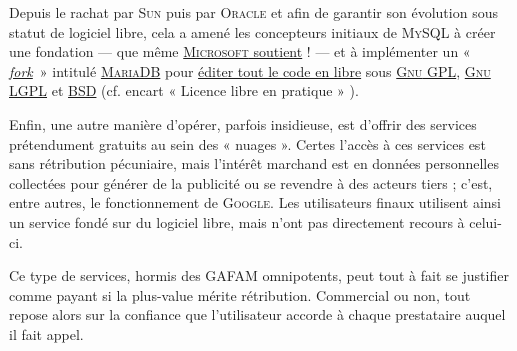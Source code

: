 \begin{enumerate}
Depuis le rachat par \textsc{Sun} puis par \textsc{Oracle} et afin de garantir son évolution sous statut de logiciel libre, cela a amené les concepteurs initiaux de \textsc{MySQL} à créer une fondation --- que même \href{https://mariadb.org/donate/}{\textsc{Microsoft} soutient} ! --- et à implémenter un « \href{https://fr.wikipedia.org/wiki/Fork_(d\%C3\%A9veloppement\_logiciel)}{\textit{fork}}~» intitulé \href{https://mariadb.org/}{\textsc{MariaDB}} pour \href{https://mariadb.com/kb/fr/mariadb-vs-mysql-features/}{éditer tout le code en libre} sous \href{https://www.gnu.org/licenses/gpl-3.0.html}{\textsc{Gnu} GPL}, \href{https://www.gnu.org/licenses/lgpl-3.0.html}{\textsc{Gnu} LGPL} et \href{https://opensource.org/licenses}{BSD} (cf. encart « Licence libre en pratique » ).
\end{enumerate}

Enfin, une autre manière d'opérer, parfois insidieuse, est d'offrir des services prétendument gratuits au sein des « nuages ». Certes l'accès à ces services est sans rétribution pécuniaire, mais l'intérêt marchand est en données personnelles collectées pour générer de la publicité ou se revendre à des acteurs tiers ; c'est, entre autres, le fonctionnement de \textsc{Google}. Les utilisateurs finaux utilisent ainsi un service fondé sur du logiciel libre, mais n’ont pas directement recours à celui-ci.

Ce type de services, hormis des GAFAM omnipotents, peut tout à fait se justifier comme payant si la plus-value mérite rétribution. Commercial ou non, tout repose alors sur la confiance que l'utilisateur accorde à chaque prestataire auquel il fait appel. 

